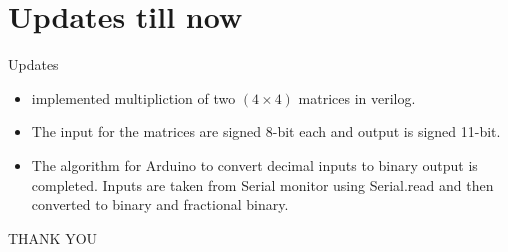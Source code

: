 \documentclass[10pt]{beamer}
\begin{document}
\section{Updates till now}
\begin{frame}{Updates}
    \begin{itemize}
        \item implemented multipliction of two $(4\times4)$ matrices in verilog.
        \item The input for the matrices are signed 8-bit each and output is signed 11-bit.
        \item The algorithm for Arduino to convert decimal inputs to binary output is completed. Inputs are taken from Serial monitor using Serial.read and then converted to binary and fractional binary.
    \end{itemize}
    
\end{frame}
{
\begin{frame}[standout]
  \Huge{THANK YOU}
\end{frame}
}
\end{document}
